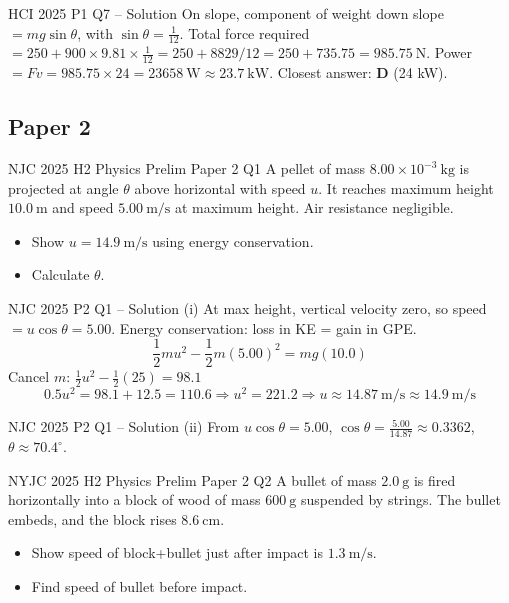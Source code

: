 \documentclass[11pt]{beamer}
\begin{document}
\begin{frame}{HCI 2025 P1 Q7 – Solution}
On slope, component of weight down slope $= mg\sin\theta$, with $\sin\theta = \frac{1}{12}$.
Total force required $= 250 + 900\times9.81\times\frac{1}{12} = 250 + 8829/12 = 250 + 735.75 = 985.75\ \mathrm{N}$.
Power $= Fv = 985.75\times24 = 23658\ \mathrm{W} \approx 23.7\ \mathrm{kW}$.
Closest answer: \textbf{D} (24 kW).
\end{frame}

\subsection{Paper 2}

\begin{frame}[shrink=15]{NJC 2025 H2 Physics Prelim Paper 2 Q1}
A pellet of mass $8.00\times10^{-3}\ \mathrm{kg}$ is projected at angle $\theta$ above horizontal with speed $u$. It reaches maximum height $10.0\ \mathrm{m}$ and speed $5.00\ \mathrm{m/s}$ at maximum height. Air resistance negligible.
\begin{itemize}
    \item[(a)(i)] Show $u = 14.9\ \mathrm{m/s}$ using energy conservation.
    \item[(a)(ii)] Calculate $\theta$.
\end{itemize}
\end{frame}

\begin{frame}{NJC 2025 P2 Q1 – Solution (i)}
At max height, vertical velocity zero, so speed $= u\cos\theta = 5.00$.
Energy conservation: loss in KE = gain in GPE.
\[ \frac12 m u^2 - \frac12 m (5.00)^2 = m g (10.0) \]
Cancel $m$: $\frac12 u^2 - \frac12 (25) = 98.1$
\[ 0.5 u^2 = 98.1 + 12.5 = 110.6 \Rightarrow u^2 = 221.2 \Rightarrow u \approx 14.87\ \mathrm{m/s} \approx 14.9\ \mathrm{m/s} \]
\end{frame}

\begin{frame}{NJC 2025 P2 Q1 – Solution (ii)}
From $u\cos\theta = 5.00$, $\cos\theta = \frac{5.00}{14.87} \approx 0.3362$, $\theta \approx 70.4^\circ$.
\end{frame}

\begin{frame}[shrink=15]{NYJC 2025 H2 Physics Prelim Paper 2 Q2}
A bullet of mass $2.0\ \mathrm{g}$ is fired horizontally into a block of wood of mass $600\ \mathrm{g}$ suspended by strings. The bullet embeds, and the block rises $8.6\ \mathrm{cm}$. 
\begin{itemize}
    \item[(b)(i)] Show speed of block+bullet just after impact is $1.3\ \mathrm{m/s}$.
    \item[(b)(ii)] Find speed of bullet before impact.
\end{itemize}
\end{frame}
\end{document}
